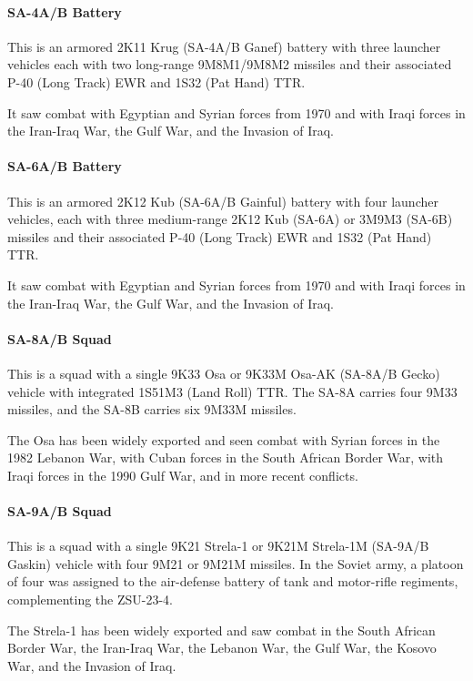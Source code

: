 \paragraph{SA-4A/B Battery}

This is an armored 2K11 Krug (SA-4A/B Ganef) battery with three launcher vehicles each with two long-range 9M8M1/9M8M2 missiles and their associated P-40 (Long Track) EWR and 1S32 (Pat Hand) TTR.

It saw combat with Egyptian and Syrian forces from 1970 and with Iraqi forces in the Iran-Iraq War, the Gulf War, and the Invasion of Iraq.

\paragraph{SA-6A/B Battery}

This is an armored 2K12 Kub (SA-6A/B Gainful) battery with four launcher vehicles, each with three medium-range 2K12 Kub (SA-6A) or 3M9M3 (SA-6B) missiles and their associated P-40 (Long Track) EWR and 1S32 (Pat Hand) TTR.

It saw combat with Egyptian and Syrian forces from 1970 and with Iraqi forces in the Iran-Iraq War, the Gulf War, and the Invasion of Iraq.

\paragraph{SA-8A/B Squad}

This is a squad with a single 9K33 Osa or 9K33M Osa-AK (SA-8A/B Gecko) vehicle with integrated 1S51M3 (Land Roll) TTR.
The SA-8A carries four 9M33 missiles, and the SA-8B carries six 9M33M missiles.

The Osa has been widely exported and seen combat with Syrian forces in the 1982 Lebanon War, with Cuban forces in the South African Border War, with Iraqi forces in the 1990 Gulf War, and in more recent conflicts.

\paragraph{SA-9A/B Squad}

This is a squad with a single 9K21 Strela-1 or 9K21M Strela-1M (SA-9A/B Gaskin) vehicle with four 9M21 or 9M21M missiles.
In the Soviet army, a platoon of four was assigned to the air-defense battery of tank and motor-rifle regiments, complementing the ZSU-23-4.

The Strela-1 has been widely exported and saw combat in the South African Border War, the Iran-Iraq War, the Lebanon War, the Gulf War, the Kosovo War, and the Invasion of Iraq.

